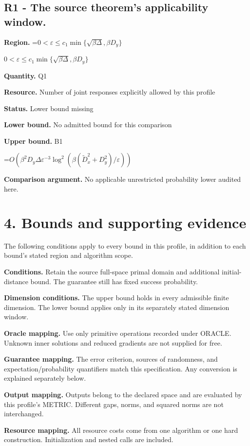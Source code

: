 \documentclass[10pt,a4paper]{article}
\newcommand{\AtlasMath}[1]{\par\begingroup\centering\setbox0=\hbox{$\displaystyle #1$}\ifdim\wd0>1.4\linewidth\typeout{ATLAS WIDE FORMULA: \the\wd0}\fi\ifdim\wd0>\linewidth\resizebox{\linewidth}{!}{\box0}\else\box0\fi\par\endgroup}
\newcommand{\AtlasInlineMath}[1]{\begingroup\setbox0=\hbox{$#1$}\ifdim\wd0>.4\linewidth\endgroup\AtlasMath{#1}\else\endgroup$#1$\fi}
\begin{document}
\subsection{R1 - The source theorem’s applicability window.}
\textbf{Region.} \AtlasInlineMath{0<\varepsilon\le c_1\min\{\sqrt{\beta\Delta},\beta D_y\}}

\textbf{Quantity.} Q1

\textbf{Resource.} Number of joint responses explicitly allowed by this profile

\textbf{Status.} Lower bound missing

\textbf{Lower bound.} No admitted bound for this comparison

\textbf{Upper bound.} B1

\AtlasMath{O(\beta^2D_y\Delta\varepsilon^{-3}\log^2(\beta(\widetilde{D}_x^2+D_y^2)/\varepsilon))}
\textbf{Comparison argument.} No applicable unrestricted probability lower audited here.

\section{4. Bounds and supporting evidence}
The following conditions apply to every bound in this profile, in addition to each bound's stated region and algorithm scope.

\textbf{Conditions.} Retain the source full-space primal domain and additional initial-distance bound. The guarantee still has fixed success probability.

\textbf{Dimension conditions.} The upper bound holds in every admissible finite dimension. The lower bound applies only in its separately stated dimension window.

\textbf{Oracle mapping.} Use only primitive operations recorded under ORACLE. Unknown inner solutions and reduced gradients are not supplied for free.

\textbf{Guarantee mapping.} The error criterion, sources of randomness, and expectation/probability quantifiers match this specification. Any conversion is explained separately below.

\textbf{Output mapping.} Outputs belong to the declared space and are evaluated by this profile's METRIC. Different gaps, norms, and squared norms are not interchanged.

\textbf{Resource mapping.} All resource costs come from one algorithm or one hard construction. Initialization and nested calls are included.
\end{document}
